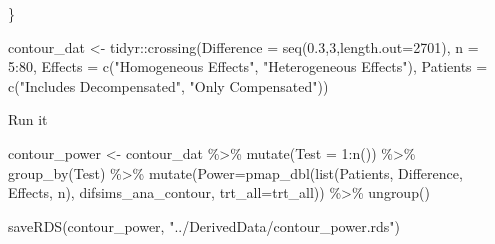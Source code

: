 \documentclass[
]{article}
\newenvironment{Shaded}{\begin{snugshade}}{\end{snugshade}}
\newcommand{\AttributeTok}[1]{\textcolor[rgb]{0.77,0.63,0.00}{#1}}
\newcommand{\DecValTok}[1]{\textcolor[rgb]{0.00,0.00,0.81}{#1}}
\newcommand{\FloatTok}[1]{\textcolor[rgb]{0.00,0.00,0.81}{#1}}
\newcommand{\FunctionTok}[1]{\textcolor[rgb]{0.00,0.00,0.00}{#1}}
\newcommand{\NormalTok}[1]{#1}
\newcommand{\OtherTok}[1]{\textcolor[rgb]{0.56,0.35,0.01}{#1}}
\newcommand{\SpecialCharTok}[1]{\textcolor[rgb]{0.00,0.00,0.00}{#1}}
\newcommand{\StringTok}[1]{\textcolor[rgb]{0.31,0.60,0.02}{#1}}
\begin{document}
\begin{Shaded}
\begin{Highlighting}[]
\NormalTok{\}}

\NormalTok{contour\_dat }\OtherTok{\textless{}{-}}\NormalTok{ tidyr}\SpecialCharTok{::}\FunctionTok{crossing}\NormalTok{(}\AttributeTok{Difference =} \FunctionTok{seq}\NormalTok{(}\FloatTok{0.3}\NormalTok{,}\DecValTok{3}\NormalTok{,}\AttributeTok{length.out=}\DecValTok{2701}\NormalTok{),}
                               \AttributeTok{n =} \DecValTok{5}\SpecialCharTok{:}\DecValTok{80}\NormalTok{,}
                               \AttributeTok{Effects =} \FunctionTok{c}\NormalTok{(}\StringTok{"Homogeneous Effects"}\NormalTok{, }
                                           \StringTok{"Heterogeneous Effects"}\NormalTok{),}
                               \AttributeTok{Patients =} \FunctionTok{c}\NormalTok{(}\StringTok{"Includes Decompensated"}\NormalTok{, }
                                            \StringTok{"Only Compensated"}\NormalTok{))}
\end{Highlighting}
\end{Shaded}

Run it

\begin{Shaded}
\begin{Highlighting}[]
\NormalTok{contour\_power }\OtherTok{\textless{}{-}}\NormalTok{ contour\_dat }\SpecialCharTok{\%\textgreater{}\%} 
  \FunctionTok{mutate}\NormalTok{(}\AttributeTok{Test =} \DecValTok{1}\SpecialCharTok{:}\FunctionTok{n}\NormalTok{()) }\SpecialCharTok{\%\textgreater{}\%} 
  \FunctionTok{group\_by}\NormalTok{(Test) }\SpecialCharTok{\%\textgreater{}\%} 
  \FunctionTok{mutate}\NormalTok{(}\AttributeTok{Power=}\FunctionTok{pmap\_dbl}\NormalTok{(}\FunctionTok{list}\NormalTok{(Patients, Difference, Effects, n), }
\NormalTok{                        difsims\_ana\_contour, }\AttributeTok{trt\_all=}\NormalTok{trt\_all)) }\SpecialCharTok{\%\textgreater{}\%} 
  \FunctionTok{ungroup}\NormalTok{()}

\FunctionTok{saveRDS}\NormalTok{(contour\_power, }\StringTok{"../DerivedData/contour\_power.rds"}\NormalTok{)}
\end{Highlighting}
\end{Shaded}
\end{document}
